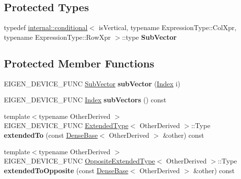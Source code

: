 \subsection*{Protected Types}
\begin{DoxyCompactItemize}
\item 
\mbox{\label{class_eigen_1_1_vectorwise_op_ad2884ab2a7720186e5adcc323e3a6e8e}} 
typedef \mbox{\hyperlink{struct_eigen_1_1internal_1_1conditional}{internal\+::conditional}}$<$ is\+Vertical, typename Expression\+Type\+::\+Col\+Xpr, typename Expression\+Type\+::\+Row\+Xpr $>$\+::type {\bfseries Sub\+Vector}
\end{DoxyCompactItemize}
\subsection*{Protected Member Functions}
\begin{DoxyCompactItemize}
\item 
\mbox{\label{class_eigen_1_1_vectorwise_op_a0d5388d48f6227996ebe175be831c581}} 
E\+I\+G\+E\+N\+\_\+\+D\+E\+V\+I\+C\+E\+\_\+\+F\+U\+NC \mbox{\hyperlink{struct_eigen_1_1internal_1_1true__type}{Sub\+Vector}} {\bfseries sub\+Vector} (\mbox{\hyperlink{class_eigen_1_1_vectorwise_op_a4907c654e5810edd98e4162093b19532}{Index}} i)
\item 
\mbox{\label{class_eigen_1_1_vectorwise_op_ac15de133a3c8a936949826e57415865d}} 
E\+I\+G\+E\+N\+\_\+\+D\+E\+V\+I\+C\+E\+\_\+\+F\+U\+NC \mbox{\hyperlink{class_eigen_1_1_vectorwise_op_a4907c654e5810edd98e4162093b19532}{Index}} {\bfseries sub\+Vectors} () const
\item 
\mbox{\label{class_eigen_1_1_vectorwise_op_aa1a4b259684079b6615269c32ccff492}} 
{\footnotesize template$<$typename Other\+Derived $>$ }\\E\+I\+G\+E\+N\+\_\+\+D\+E\+V\+I\+C\+E\+\_\+\+F\+U\+NC \mbox{\hyperlink{struct_eigen_1_1_vectorwise_op_1_1_extended_type}{Extended\+Type}}$<$ Other\+Derived $>$\+::Type {\bfseries extended\+To} (const \mbox{\hyperlink{class_eigen_1_1_dense_base}{Dense\+Base}}$<$ Other\+Derived $>$ \&other) const
\item 
\mbox{\label{class_eigen_1_1_vectorwise_op_a768712a7d82deb259f70c5b161e77bcc}} 
{\footnotesize template$<$typename Other\+Derived $>$ }\\E\+I\+G\+E\+N\+\_\+\+D\+E\+V\+I\+C\+E\+\_\+\+F\+U\+NC \mbox{\hyperlink{struct_eigen_1_1_vectorwise_op_1_1_opposite_extended_type}{Opposite\+Extended\+Type}}$<$ Other\+Derived $>$\+::Type {\bfseries extended\+To\+Opposite} (const \mbox{\hyperlink{class_eigen_1_1_dense_base}{Dense\+Base}}$<$ Other\+Derived $>$ \&other) const
\end{DoxyCompactItemize}
